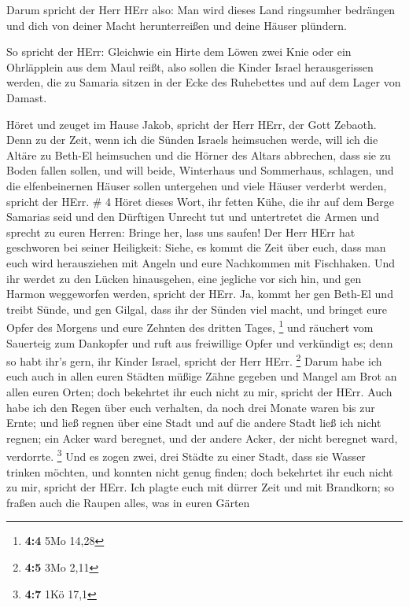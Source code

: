  Darum spricht der Herr HErr also: Man wird dieses Land
ringsumher bedrängen und dich von deiner Macht herunterreißen und deine
Häuser plündern.

 So spricht der HErr: Gleichwie ein Hirte dem Löwen zwei
Knie oder ein Ohrläpplein aus dem Maul reißt, also sollen die Kinder
Israel herausgerissen werden, die zu Samaria sitzen in der Ecke des
Ruhebettes und auf dem Lager von Damast.

 Höret und zeuget im Hause Jakob, spricht der Herr HErr,
der Gott Zebaoth.  Denn zu der Zeit, wenn ich die Sünden
Israels heimsuchen werde, will ich die Altäre zu Beth-El heimsuchen und
die Hörner des Altars abbrechen, dass sie zu Boden fallen sollen,
 und will beide, Winterhaus und Sommerhaus, schlagen, und
die elfenbeinernen Häuser sollen untergehen und viele Häuser verderbt
werden, spricht der HErr. \# 4  Höret dieses Wort, ihr
fetten Kühe, die ihr auf dem Berge Samarias seid und den Dürftigen
Unrecht tut und untertretet die Armen und sprecht zu euren Herren:
Bringe her, lass uns saufen!  Der Herr HErr hat geschworen
bei seiner Heiligkeit: Siehe, es kommt die Zeit über euch, dass man euch
wird herausziehen mit Angeln und eure Nachkommen mit Fischhaken.
 Und ihr werdet zu den Lücken hinausgehen, eine jegliche vor
sich hin, und gen Harmon weggeworfen werden, spricht der HErr.
 Ja, kommt her gen Beth-El und treibt Sünde, und gen Gilgal,
dass ihr der Sünden viel macht, und bringet eure Opfer des Morgens und
eure Zehnten des dritten Tages, \footnote{\textbf{4:4} 5Mo 14,28}
 und räuchert vom Sauerteig zum Dankopfer und ruft aus
freiwillige Opfer und verkündigt es; denn so habt ihr's gern, ihr Kinder
Israel, spricht der Herr HErr. \footnote{\textbf{4:5} 3Mo 2,11}
 Darum habe ich euch auch in allen euren Städten müßige
Zähne gegeben und Mangel am Brot an allen euren Orten; doch bekehrtet
ihr euch nicht zu mir, spricht der HErr.  Auch habe ich den
Regen über euch verhalten, da noch drei Monate waren bis zur Ernte; und
ließ regnen über eine Stadt und auf die andere Stadt ließ ich nicht
regnen; ein Acker ward beregnet, und der andere Acker, der nicht
beregnet ward, verdorrte. \footnote{\textbf{4:7} 1Kö 17,1} 
Und es zogen zwei, drei Städte zu einer Stadt, dass sie Wasser trinken
möchten, und konnten nicht genug finden; doch bekehrtet ihr euch nicht
zu mir, spricht der HErr.  Ich plagte euch mit dürrer Zeit
und mit Brandkorn; so fraßen auch die Raupen alles, was in euren Gärten

